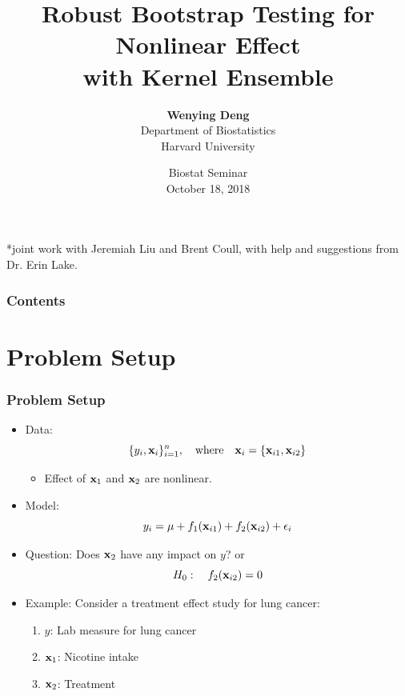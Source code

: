 \documentclass{beamer}
\begin{document}
\title{Robust Bootstrap Testing for Nonlinear Effect  \\ 
with Kernel Ensemble}
\author{\textbf{Wenying Deng}\\ 
Department of Biostatistics \\
Harvard University}
\date{Biostat Seminar \\ October 18, 2018}
\begin{frame}
\titlepage
\begin{tiny}
*joint work with Jeremiah Liu and Brent Coull, with help and suggestions from Dr. Erin Lake.
\end{tiny}
\end{frame}

\begin{frame}
\frametitle{Contents} %
\tableofcontents[hideallsubsections]
\end{frame}

\section{Problem Setup} 

\begin{frame}
\frametitle{Problem Setup}
\begin{itemize}[<+->]
\item Data: 
$$\{ y_i, {\bf x}_i \}_{i=1}^n, \quad \mbox{where} \quad 
{\bf x}_i= \{{\bf x}_{i1}, {\bf x}_{i2}\}$$
\begin{itemize}
\item Effect of ${\bf x}_1$ and ${\bf x}_2$ are nonlinear.
\end{itemize}
\item Model:
$$y_i=\mu + f_1({\bf x}_{i1})+ f_2({\bf x}_{i2})+\epsilon_i$$
\item Question: Does ${\bf x}_{2}$ have any impact on $y$? or
$$ H_0: \quad f_2({\bf x}_{i2}) = 0$$
\item Example: Consider a treatment effect study for lung cancer:
\begin{enumerate}
\item $y$: Lab measure for lung cancer
\item ${\bf x}_1$: Nicotine intake
\item ${\bf x}_2$: Treatment
\end{enumerate}
\end{itemize}
\end{frame}
\end{document}
